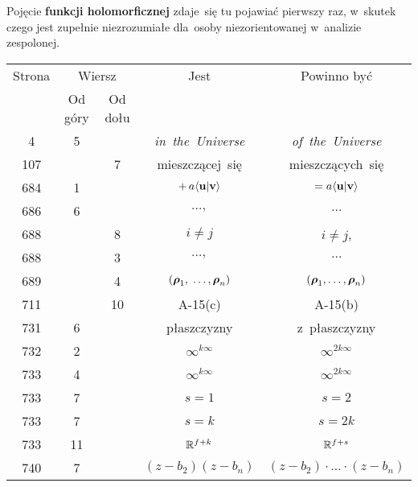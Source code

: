 \documentclass[a4paper,11pt]{article}
\begin{document}
\noindent
{} Pojęcie \textbf{funkcji holomorficznej} zdaje~się tu
pojawiać pierwszy raz, w~skutek czego jest zupełnie niezrozumiałe
dla~osoby niezorientowanej w~analizie zespolonej.





\newpage



\begin{center}

  \begin{tabular}{|c|c|c|c|c|}
    \hline
    Strona & \multicolumn{2}{c|}{Wiersz} & Jest
                              & Powinno być \\ \cline{2-3}
    & Od góry & Od dołu & & \\
    \hline
    4   &  5 & & \textit{in~the~Universe} & \textit{of~the~Universe} \\
    107 & &  7 & mieszczącej~się & mieszczących~się \\
    684 &  1 & & $+\, a \langle \mathbf{u} | \mathbf{v} \rangle$
           & $= a \langle \mathbf{u} | \mathbf{v} \rangle$ \\
    686 &  6 & & $\ldots,$ & $\ldots$ \\
    688 & &  8 & $i \neq j$ & $i \neq j$, \\
    688 & &  3 & $\ldots,$ & $\ldots$ \\
    689 & &  4 & $( \boldsymbol{\rho}_{ 1 },\; \ldots, \boldsymbol{\rho}_{ n } )$
           & $( \boldsymbol{\rho}_{ 1 }, \ldots, \boldsymbol{\rho}_{ n } )$ \\
    711 & & 10 & A-15(c) & A-15(b) \\
    731 &  6 & & płaszczyzny & z~płaszczyzny \\
    732 &  2 & & $\infty^{ k \infty }$ & $\infty^{ 2 k \infty }$ \\
    733 &  4 & & $\infty^{ k \infty }$ & $\infty^{ 2 k \infty }$ \\
    733 &  7 & & $s = 1$ & $s = 2$ \\
    733 &  7 & & $s = k$ & $s = 2k$ \\
    733 & 11 & & $\mathbb{R}^{ f + k }$ & $\mathbb{R}^{ f + s }$ \\
    740 &  7 & & $( z - b_{ 2 } )( z - b_{ n } )$
    & $( z - b_{ 2 } ) \cdot \ldots \cdot ( z - b_{ n } )$ \\
    \hline
  \end{tabular}

\end{center}
\end{document}

